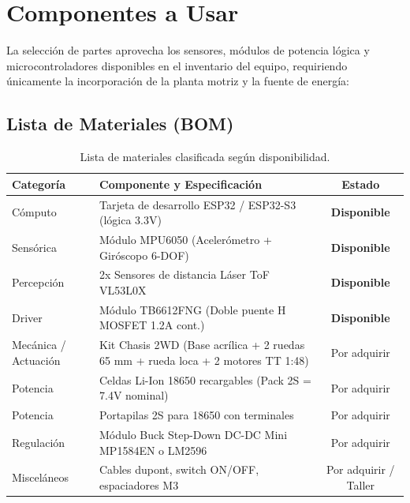 \documentclass[11pt,a4paper]{article}
\begin{document}
\section{Componentes a Usar}

La selección de partes aprovecha los sensores, módulos de potencia lógica y microcontroladores disponibles en el inventario del equipo, requiriendo únicamente la incorporación de la planta motriz y la fuente de energía:

\subsection{Lista de Materiales (BOM)}
\begin{table}[h!]
\centering
\small
\begin{tabularx}{\textwidth}{l p{7.5cm} c}
\toprule
\textbf{Categoría} & \textbf{Componente y Especificación} & \textbf{Estado} \\
\midrule
Cómputo & Tarjeta de desarrollo ESP32 / ESP32-S3 (lógica 3.3V) & \textbf{Disponible} \\
Sensórica & Módulo MPU6050 (Acelerómetro + Giróscopo 6-DOF) & \textbf{Disponible} \\
Percepción & 2x Sensores de distancia Láser ToF VL53L0X & \textbf{Disponible} \\
Driver & Módulo TB6612FNG (Doble puente H MOSFET 1.2A cont.) & \textbf{Disponible} \\
\midrule
Mecánica / Actuación & Kit Chasis 2WD (Base acrílica + 2 ruedas 65 mm + rueda loca + 2 motores TT 1:48) & Por adquirir \\
Potencia & Celdas Li-Ion 18650 recargables (Pack 2S = 7.4V nominal) & Por adquirir \\
Potencia & Portapilas 2S para 18650 con terminales & Por adquirir \\
Regulación & Módulo Buck Step-Down DC-DC Mini MP1584EN o LM2596 & Por adquirir \\
Misceláneos & Cables dupont, switch ON/OFF, espaciadores M3 & Por adquirir / Taller \\
\bottomrule
\end{tabularx}
\caption{Lista de materiales clasificada según disponibilidad.}
\label{tab:componentes}
\end{table}
\end{document}
